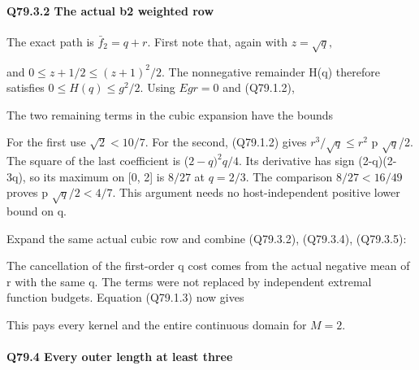 \paragraph{Q79.3.2 The actual b2 weighted row}

The exact path is \(\bar f_2=q+r.\) First note that, again with \(z=\sqrt{q},\allowbreak \)


and \(0\le z+1/2\le (z+1)^2/2.\) The nonnegative remainder H(q) therefore
satisfies \(0\le H(q)\le g^2/2.\) Using \(Egr=0\) and (Q79.1.2),


The two remaining terms in the cubic expansion have the bounds


For the first use \(\sqrt{2}<10/7.\) For the second, (Q79.1.2) gives
\(r^3/\sqrt{q}\le r^2\) p \(\sqrt{q}\)/2. The square of the last coefficient
is (\(2-q)^2q/4.\) Its derivative has sign (2-q)(2-3q), so its maximum
on [0, 2] is \(8/27\) at \(q=2/3.\) The comparison \(8/27<16/49\) proves
p \(\sqrt{q}/2<4/7.\) This argument needs no host-independent positive lower bound on q.

Expand the same actual cubic row and combine (Q79.3.2), (Q79.3.4), (Q79.3.5):


The cancellation of the first-order q cost comes from the actual
negative mean of r with the same q. The terms were not replaced by
independent extremal function budgets. Equation (Q79.1.3) now gives


This pays every kernel and the entire continuous domain for \(M=2.\)

\paragraph{Q79.4 Every outer length at least three}

